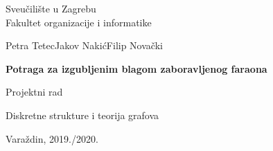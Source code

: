 \begin{titlepage}
\begin{center}
	{\large Sveučilište u Zagrebu\\Fakultet organizacije i informatike}

	\vspace{5cm}

	{\Large Petra Tetec\qquad Jakov Nakić\qquad Filip Novački}
	\vspace{0.3cm}

	{\LARGE \bf Potraga za izgubljenim blagom zaboravljenog faraona }

	\vspace{0.7cm}
	Projektni rad
	\vspace{0.2cm}

	{\large Diskretne strukture i teorija grafova}

	\vspace*{\fill}

	Varaždin, 2019./2020.

\end{center}
\end{titlepage}
